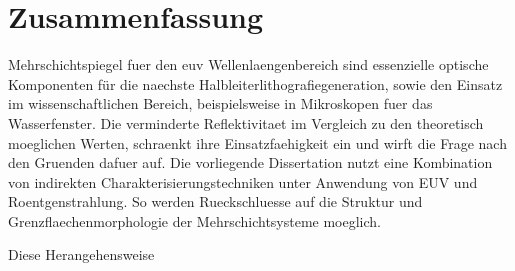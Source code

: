 \cleardoublepage

\thispagestyle{empty}

\section*{Zusammenfassung}
    
    Mehrschichtspiegel fuer den \gls{euv} Wellenlaengenbereich sind essenzielle optische Komponenten für die naechste Halbleiterlithografiegeneration, sowie den Einsatz im wissenschaftlichen Bereich, beispielsweise in Mikroskopen fuer das Wasserfenster. Die verminderte Reflektivitaet im Vergleich zu den theoretisch moeglichen Werten, schraenkt ihre Einsatzfaehigkeit ein und wirft die Frage nach den Gruenden dafuer auf. Die vorliegende Dissertation nutzt eine Kombination von indirekten Charakterisierungstechniken unter Anwendung von EUV und Roentgenstrahlung. So werden Rueckschluesse auf die Struktur und Grenzflaechenmorphologie der Mehrschichtsysteme moeglich.
    
    Diese Herangehensweise

\cleardoublepage
